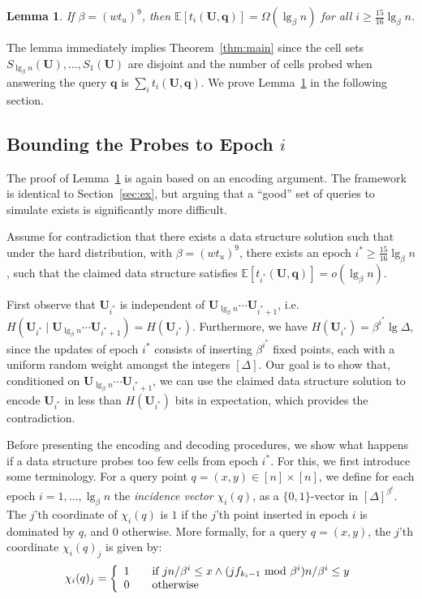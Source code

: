 \documentclass[letterpaper]{article}
\newtheorem{lemma}{Lemma}
\newcommand{\E}{\mathbb{E}}
\newcommand{\is}{{i^*}}
\newcommand{\uv}{\textbf{u}}
\newcommand{\U}{\textbf{U}}
\newcommand{\inc}[1]{\chi_{#1}}
\newcommand{\q}{\textbf{q}}
\begin{document}
\begin{lemma}
\label{lem:probes}
If $\beta = (w t_u)^9$, then $\E[t_i(\U,\q)] =
\Omega(\lg_\beta n)$ for all $i \geq \tfrac{15}{16} \lg_\beta n$.
\end{lemma}

The lemma immediately implies Theorem~\ref{thm:main} since the cell
sets $S_{\lg_\beta n}(\U),\dots,S_1(\U)$ are disjoint and the number
of cells probed when answering the query $\q$ is $\sum_i
t_i(\U,\q)$. We prove Lemma~\ref{lem:probes} in the following section.

\subsection{Bounding the Probes to Epoch $i$}
The proof of Lemma~\ref{lem:probes} is again based on an encoding
argument. The framework is identical to Section~\ref{sec:ex}, but
arguing that a ``good'' set of queries to simulate exists is
significantly more difficult.

Assume for contradiction that there exists a data structure solution
such that under the hard distribution, with $\beta=(wt_u)^9$, there
exists an epoch $\is \geq \tfrac{15}{16} \lg_\beta n$, such that the
claimed data structure satisfies $\E[t_\is(\U,\q)] = o(\lg_\beta n)$.

First observe that $\U_\is$ is independent of $\U_{\lg_\beta n} \cdots
\U_{\is+1}$, i.e. $H(\U_\is \mid \U_{\lg_\beta n} \cdots
\U_{\is+1})=H(\U_\is)$. Furthermore, we have $H(\U_\is)=\beta^\is \lg
\Delta$, since the updates of epoch $\is$ consists of inserting
$\beta^\is$ fixed points, each with a uniform random weight amongst
the integers $[\Delta]$. Our goal is to show that, conditioned on
$\U_{\lg_\beta n} \cdots \U_{\is+1}$, we can use the claimed data
structure solution to encode $\U_\is$ in less than $H(\U_\is)$ bits in
expectation, which provides the contradiction.

Before presenting the encoding and decoding procedures, we show what
happens if a data structure probes too few cells from epoch $\is$. For
this, we first introduce some terminology. For a query point $q=(x,y)
\in [n] \times [n]$, we define for each epoch $i=1,\dots,\lg_\beta n$
the \emph{incidence vector} $\inc{i}(q)$, as a $\{0,1\}$-vector in
$[\Delta]^{\beta^i}$. The $j$'th coordinate of $\inc{i}(q)$ is $1$ if
the $j$'th point inserted in epoch $i$ is dominated by $q$, and $0$
otherwise. More formally, for a query $q=(x,y)$, the $j$'th coordinate
$\inc{i}(q)_j$ is given by:
\[
\inc{i}(q)_j = \left \{ \begin{array}{l l}
  1 & \quad \text{if }jn/\beta^i \leq x \wedge (jf_{k_i-1}\textrm{ mod } \beta^i)n/\beta^i\leq y\\
  0 & \quad \text{otherwise} 
  \end{array} \right.
\]
\end{document}
